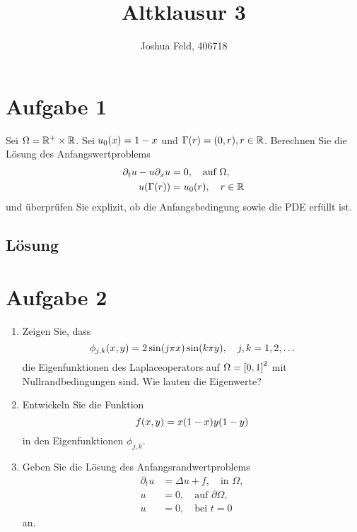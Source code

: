 \documentclass{exercise}
\institute{Applied and Computational Mathematics}
\title{Altklausur 3}
\author{Joshua Feld, 406718}
\begin{document}
    \maketitle


    \section*{Aufgabe 1}
    
    \begin{problem}
        Sei \(\Omega = \R^+ \times \R\).
        Sei \(u_0\parentheses*{x} = 1 - x\) und \(\Gamma\parentheses*{r} = \parentheses*{0, r}, r \in \R\).
        Berechnen Sie die Lösung des Anfangswertproblems
        \begin{align*}
            \partial_t u - u\partial_x u &= 0, \quad \text{auf }\Omega,\\
            u\parentheses*{\Gamma\parentheses*{r}} &= u_0\parentheses*{r}, \quad r \in \R
        \end{align*}
        und überprüfen Sie explizit, ob die Anfangsbedingung sowie die PDE erfüllt ist.
    \end{problem}
    
    \subsection*{Lösung}


    \section*{Aufgabe 2}
    
    \begin{problem}
        \begin{enumerate}
            \item Zeigen Sie, dass
            \[
                \phi_{j, k}\parentheses*{x, y} = 2\sin\parentheses*{j\pi x}\sin\parentheses*{k\pi y}, \quad j, k = 1, 2, \ldots
            \]
            die Eigenfunktionen des Laplaceoperators auf \(\Omega = \brackets*{0, 1}^2\) mit Nullrandbedingungen sind.
            Wie lauten die Eigenwerte?
            \item Entwickeln Sie die Funktion
            \[
                f\parentheses*{x, y} = x\parentheses*{1 - x}y\parentheses*{1 - y}
            \]
            in den Eigenfunktionen \(\phi_{j, k}\).
            \item Geben Sie die Lösung des Anfangsrandwertproblems
            \begin{align*}
                \partial_t u &= \Delta u + f, \quad \text{in }\Omega,\\
                u &= 0, \quad \text{auf }\partial\Omega,\\
                u &= 0, \quad \text{bei }t = 0
            \end{align*}
            an.
        \end{enumerate}
    \end{problem}
    
\end{document}
